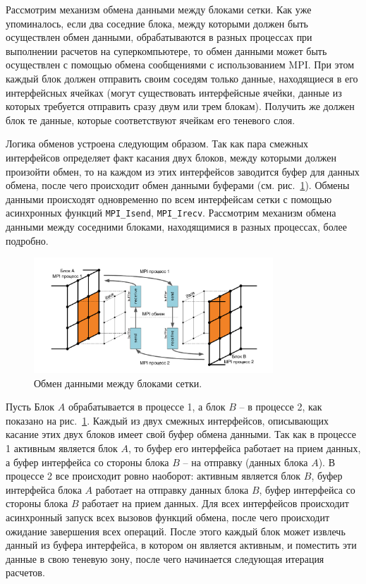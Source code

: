 Рассмотрим механизм обмена данными между блоками сетки.
Как уже упоминалось, если два соседние блока, между которыми должен быть осуществлен обмен данными, обрабатываются в разных процессах при выполнении расчетов на суперкомпьютере, то обмен данными может быть осуществлен с помощью обмена сообщениями с использованием MPI.
При этом каждый блок должен отправить своим соседям только данные, находящиеся в его интерфейсных ячейках (могут существовать интерфейсные ячейки, данные из которых требуется отправить сразу двум или трем блокам).
Получить же должен блок те данные, которые соответствуют ячейкам его теневого слоя.

Логика обменов устроена следующим образом.
Так как пара смежных интерфейсов определяет факт касания двух блоков, между которыми должен произойти обмен, то на каждом из этих интерфейсов заводится буфер для данных обмена, после чего происходит обмен данными буферами (см. рис.~\ref{fig:text_2_block_data_exchange}).
Обмены данными происходят одновременно по всем интерфейсам сетки с помощью асинхронных функций
\texttt{MPI\_Isend}, \texttt{MPI\_Irecv}.
Рассмотрим механизм обмена данными между соседними блоками, находящимися в разных процессах, более подробно.

\begin{figure}[ht]
\centering
\includegraphics[width=0.8\textwidth]{fig/par_10-data-exchange.pdf}
\singlespacing
{}\caption{Обмен данными между блоками сетки.}
\label{fig:text_2_block_data_exchange}
\end{figure}

Пусть Блок $A$ обрабатывается в процессе 1, а блок $B$ -- в процессе 2, как показано на рис.~\ref{fig:text_2_block_data_exchange}.
Каждый из двух смежных интерфейсов, описывающих касание этих двух блоков имеет свой буфер обмена данными.
Так как в процессе 1 активным является блок $A$, то буфер его интерфейса работает на прием данных, а буфер интерфейса со стороны блока $B$ -- на отправку (данных блока $A$).
В процессе 2 все происходит ровно наоборот: активным является блок $B$, буфер интерфейса блока $A$ работает на отправку данных блока $B$, буфер интерфейса со стороны блока $B$ работает на прием данных.
Для всех интерфейсов происходит асинхронный запуск всех вызовов функций обмена, после чего происходит ожидание завершения всех операций.
После этого каждый блок может извлечь данный из буфера интерфейса, в котором он является активным, и поместить эти данные в свою теневую зону, после чего начинается следующая итерация расчетов.


